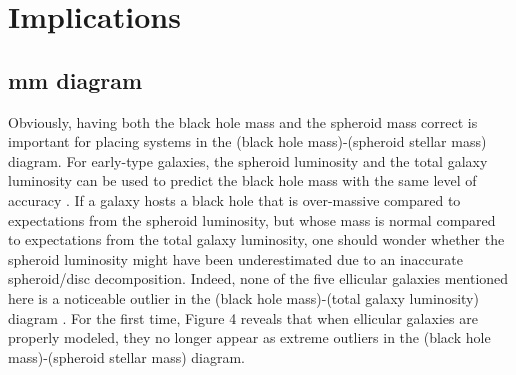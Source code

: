 \documentclass[useAMS,usenatbib,article]{mn2e}
\begin{document}
\section{Implications}
\label{sec:impl}

\subsection{mm diagram}
Obviously, having both the black hole mass and the spheroid mass correct is important 
for placing systems in the (black hole mass)-(spheroid stellar mass) diagram. 
For early-type galaxies, the spheroid luminosity and the total galaxy luminosity 
can be used to predict the black hole mass with the same level of accuracy \citep{savorgnan2015}. 
If a galaxy hosts a black hole that is over-massive compared to expectations from the spheroid luminosity, 
but whose mass is normal compared to expectations from the total galaxy luminosity, 
one should wonder whether the spheroid luminosity might have been underestimated 
due to an inaccurate spheroid/disc decomposition. 
Indeed, none of the five ellicular galaxies mentioned here is a noticeable outlier 
in the (black hole mass)-(total galaxy luminosity) diagram \citep{savorgnan2015}. 
For the first time, Figure 4 reveals that when ellicular galaxies are properly modeled, 
they no longer appear as extreme outliers in the (black hole mass)-(spheroid stellar mass) diagram.  
\end{document}
